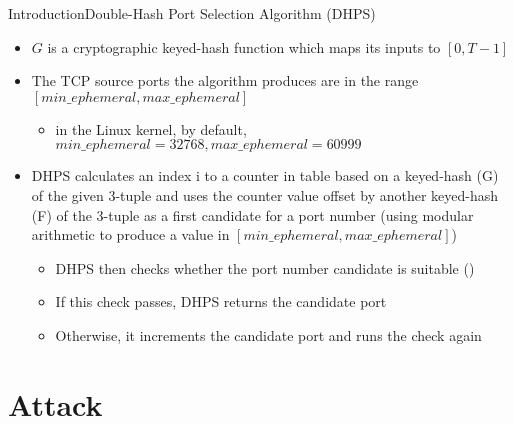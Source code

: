 \documentclass[a4paper]{article}
\begin{document}
\begin{frame}[fragile]{Introduction}{Double-Hash Port Selection Algorithm (DHPS)}
\begin{itemize}
		\item $G$ is a cryptographic keyed-hash function which maps its inputs to $[0,T-1]$
		\item The TCP source ports the algorithm produces are in the range $[min\_ephemeral,max\_ephemeral]$
		\begin{itemize}
			\item in the Linux kernel, by default, $min\_ephemeral = 32768,max\_ephemeral = 60999$
		\end{itemize}
		\item DHPS calculates an index i to a counter in table based on a keyed-hash (G) of the given 3-tuple and uses the counter value offset by another keyed-hash (F) of the 3-tuple as a first candidate for a port number (using modular arithmetic to produce a value in $[min\_ephemeral,max\_ephemeral]$)
		\begin{itemize}
			\item DHPS then checks whether the port number candidate is suitable ()
			\item If this check passes, DHPS returns the candidate port
			\item Otherwise, it increments the candidate port and runs the check again
		\end{itemize}
	\end{itemize}
\end{frame}

\section{Attack}
\end{document}
